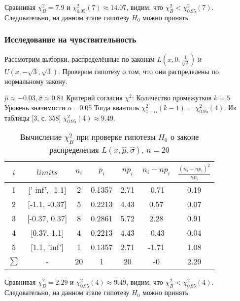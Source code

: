 \noindent Сравнивая $\chi^{2}_{B} = 7.9$ и $\chi^{2}_{0.95}(7) \approx 14.07$, видим, что $\chi^{2}_{B} < \chi^{2}_{0.95}(7)$.
Следовательно, на данном этапе гипотезу $H_{0}$ можно принять.
\\
\subsubsection{Исследование на чувствительность}
Рассмотрим выборки, распределённые по законам $L(x,0, \frac{1}{\sqrt{2}})$ и $U(x, -\sqrt{3}, \sqrt{3})$.
Проверим гипотезу о том, что они распределены по нормальному закону.

$\hat{\mu} \approx -0.03, \hat{\sigma} \approx 0.81$
\newline
Критерий согласия $\chi^{2}$:
\newline
Количество промежутков $k = 5$
\newline
Уровень значимости $\alpha$= 0.05
\newline
Тогда квантиль $\chi^{2}_{1-\alpha}(k-1)$ = $\chi^{2}_{0.95}(4)$. Из таблицы [3, с. 358] $\chi^{2}_{0.95}(4) \approx 9.49$.
\begin{table}[H]
	\centering
	\begin{tabular}{| c | c | c | c | c | c | c |}
		\hline
		$i$ & $limits$         &   $n_i$ &    $p_i$ &   $np_i$ &   $n_i - np_i$ &   $\frac{(n_i-np_i)^2}{np_i}$ \\
		\hline
   1 & ['-inf', -1.1] &     2 & 0.1357 &   2.71 &        -0.71 &                        0.19 \\
   2 & [-1.1, -0.37]  &     5 & 0.2213 &   4.43 &         0.57 &                        0.07 \\
   3 & [-0.37, 0.37]  &     8 & 0.2861 &   5.72 &         2.28 &                        0.91 \\
   4 & [0.37, 1.1]    &     4 & 0.2213 &   4.43 &        -0.43 &                        0.04 \\
   5 & [1.1, 'inf']   &     1 & 0.1357 &   2.71 &        -1.71 &                        1.08 \\
   $\sum$ & -            &    20 & 1      &  20    &        -0    &                        2.29 \\
		\hline
	\end{tabular}
	\caption{ Вычисление $\chi^{2}_{B}$ при проверке гипотезы $H_{0}$ о законе распределения $L(x,\hat{\mu}, \hat{\sigma})$, $n=20$}
	\label{tab:laplace_chi_2}
\end{table}

\noindent Сравнивая $\chi^{2}_{B} = 2.29$ и $\chi^{2}_{0.95}(4) \approx 9.49$, видим, что $\chi^{2}_{B} < \chi^{2}_{0.95}(4)$.
Следовательно, на данном этапе гипотезу $H_{0}$ можно принять.
\\



